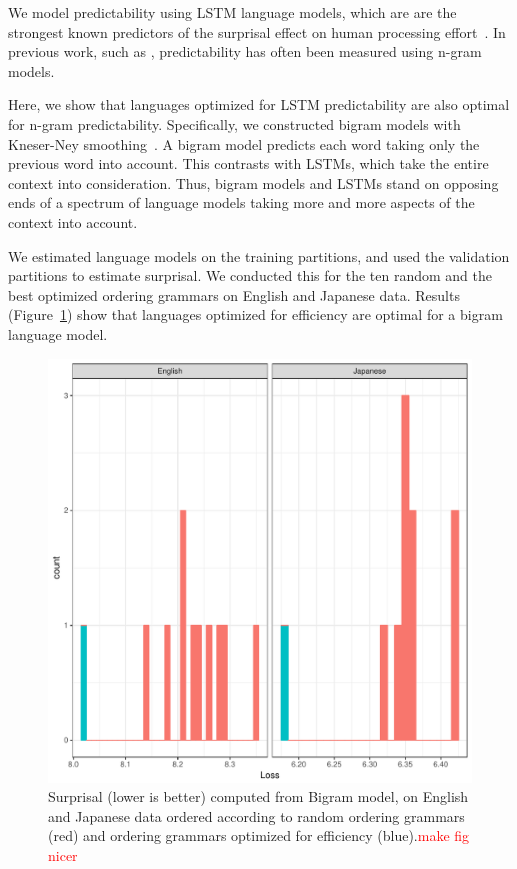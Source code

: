 \documentclass[10pt,twoside,lineno]{article}
\begin{document}
We model predictability using LSTM language models, which are are the strongest known predictors of the surprisal effect on human processing effort~\citep{frank2011insensitivity,goodkind2018predictive}.
In previous work, such as \cite{gildea2015human}, predictability has often been measured using n-gram models.

Here, we show that languages optimized for LSTM predictability are also optimal for n-gram predictability.
Specifically, we constructed bigram models with Kneser-Ney smoothing~\cite{kneser1995improved, chen1999empirical}.
A bigram model predicts each word taking only the previous word into account.
This contrasts with LSTMs, which take the entire context into consideration.
Thus, bigram models and LSTMs stand on opposing ends of a spectrum of language models taking more and more aspects of the context into account.

We estimated language models on the training partitions, and used the validation partitions to estimate surprisal.
We conducted this for the ten random and the best optimized ordering grammars on English and Japanese data.
Results (Figure~\ref{fig:bigrams}) show that languages optimized for efficiency are optimal for a bigram language model.

\begin{figure}
    \centering
    \includegraphics[scale=.4]{../results/bigrams/bigrams.pdf} 
	\caption{Surprisal (lower is better) computed from Bigram model, on English and Japanese data ordered according to random ordering grammars (red) and ordering grammars optimized for efficiency (blue).\textcolor{red}{make fig nicer}}
    \label{fig:bigrams}
\end{figure}
\end{document}
